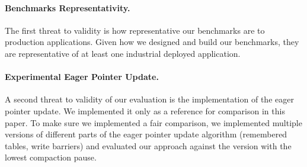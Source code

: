 \documentclass[sigplan,10pt,screen]{acmart}\settopmatter{printfolios=true,printccs=true,printacmref=true}
\newcommand{\egb}[1]{\color{blue}\fbox{\bfseries\sffamily\scriptsize Elisa:}{\sf\small$\blacktriangleright$\textit{#1}$\blacktriangleleft$}\color{black}}
\def\OpenSmalltalkVM{OpenSmalltalk-VM\xspace}
\begin{document}
\paragraph{Benchmarks Representativity.} 
\label{sec:repBench}
The first threat to validity is how representative our benchmarks are to production applications. Given how we designed and build our benchmarks, they are representative of at least one industrial deployed application. 

\paragraph{Experimental Eager Pointer Update.} 
\label{sec:expPU}
A second threat to validity of our evaluation is the implementation of the eager pointer update.
We implemented it only %
as a reference for comparison in this paper. 
To make sure we implemented a fair comparison, we implemented multiple versions of different parts of the eager pointer update algorithm (remembered tables, write barriers) and evaluated our approach against the version with the lowest compaction pause.  
\end{document}
